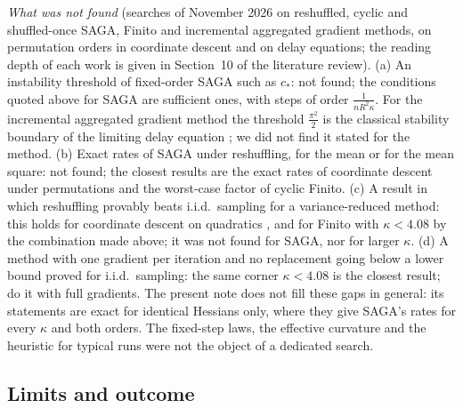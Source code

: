 \emph{What was not found} (searches of November 2026 on reshuffled, cyclic and shuffled-once SAGA, Finito and incremental aggregated gradient methods, on permutation orders in coordinate descent and on delay equations; the reading depth of each work is given in Section~10 of the literature review). (a) An instability threshold of fixed-order SAGA such as $c_\ast$: not found; the conditions quoted above for SAGA are sufficient ones, with steps of order $\frac1{nR^2\kappa}$. For the incremental aggregated gradient method the threshold $\frac{\pi^2}2$ is the classical stability boundary of the limiting delay equation \cite{matsunaga2011asymptotic}; we did not find it stated for the method. (b) Exact rates of SAGA under reshuffling, for the mean or for the mean square: not found; the closest results are the exact rates of coordinate descent under permutations and the worst-case factor of cyclic Finito. (c) A result in which reshuffling provably beats i.i.d.\ sampling for a variance-reduced method: this holds for coordinate descent on quadratics \cite{gurbuzbalaban2020randomness}, and for Finito with $\kappa<4.08$ by the combination made above; it was not found for SAGA, nor for larger $\kappa$. (d) A method with one gradient per iteration and no replacement going below a lower bound proved for i.i.d.\ sampling: the same corner $\kappa<4.08$ is the closest result; \cite{hannah2018breaking} do it with full gradients. The present note does not fill these gaps in general: its statements are exact for identical Hessians only, where they give SAGA's rates for every $\kappa$ and both orders. The fixed-step laws, the effective curvature and the heuristic for typical runs were not the object of a dedicated search.

\subsection{Limits and outcome}\label{sec:B4-outcome}


